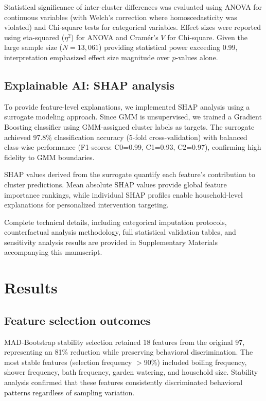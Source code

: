 \documentclass[a4paper,12pt]{article}
\begin{document}
Statistical significance of inter-cluster differences was evaluated using ANOVA for continuous variables (with Welch's correction where homoscedasticity was violated) and Chi-square tests for categorical variables. Effect sizes were reported using eta-squared ($\eta^2$) for ANOVA and Cram\'{e}r's $V$ for Chi-square. Given the large sample size ($N=13,061$) providing statistical power exceeding 0.99, interpretation emphasized effect size magnitude over $p$-values alone.

\subsection{Explainable AI: SHAP analysis}

To provide feature-level explanations, we implemented SHAP analysis using a surrogate modeling approach. Since GMM is unsupervised, we trained a Gradient Boosting classifier using GMM-assigned cluster labels as targets. The surrogate achieved 97.8\% classification accuracy (5-fold cross-validation) with balanced class-wise performance (F1-scores: C0=0.99, C1=0.93, C2=0.97), confirming high fidelity to GMM boundaries.

SHAP values derived from the surrogate quantify each feature's contribution to cluster predictions. Mean absolute SHAP values provide global feature importance rankings, while individual SHAP profiles enable household-level explanations for personalized intervention targeting.

Complete technical details, including categorical imputation protocols, 
counterfactual analysis methodology, full statistical validation tables, 
and sensitivity analysis results are provided in Supplementary Materials 
accompanying this manuscript.
\section{Results}

\subsection{Feature selection outcomes}

MAD-Bootstrap stability selection retained 18 features from the original 97, representing an 81\% reduction while preserving behavioral discrimination. The most stable features (selection frequency $>$90\%) included boiling frequency, shower frequency, bath frequency, garden watering, and household size. Stability analysis confirmed that these features consistently discriminated behavioral patterns regardless of sampling variation.
\end{document}
